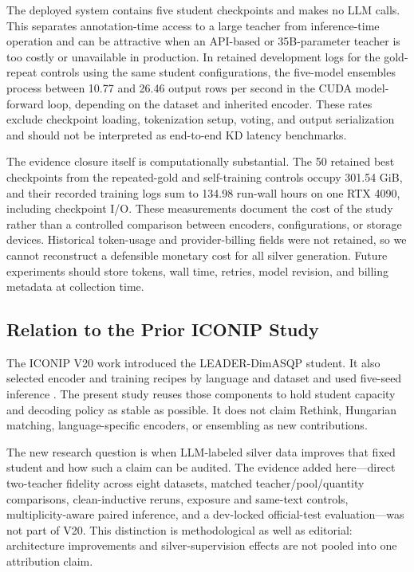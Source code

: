 The deployed system contains five student checkpoints and makes no LLM
calls. This separates annotation-time access to a large teacher from
inference-time operation and can be attractive when an API-based or
35B-parameter teacher is too costly or unavailable in production. In
retained development logs for the gold-repeat controls using the same
student configurations, the five-model ensembles process between 10.77
and 26.46 output rows per second in the CUDA model-forward loop,
depending on the dataset and inherited encoder. These rates exclude
checkpoint loading, tokenization setup, voting, and output serialization
and should not be interpreted as end-to-end KD latency benchmarks.

The evidence closure itself is computationally substantial. The 50
retained best checkpoints from the repeated-gold and self-training
controls occupy 301.54 GiB, and their recorded training logs sum to
134.98 run-wall hours on one RTX 4090, including checkpoint I/O. These
measurements document the cost of the study rather than a controlled
comparison between encoders, configurations, or storage devices.
Historical token-usage and provider-billing fields were not retained, so
we cannot reconstruct a defensible monetary cost for all silver
generation. Future experiments should store tokens, wall time, retries,
model revision, and billing metadata at collection time.

\subsection{Relation to the Prior ICONIP
Study}\label{relation-to-our-prior-iconip-study}

The ICONIP V20 work introduced the LEADER-DimASQP student. It also selected
encoder and training recipes by language and dataset and used five-seed
inference \citep{qin2026leader}. The present study reuses those components to hold
student capacity and decoding policy as stable as possible. It does not
claim Rethink, Hungarian matching, language-specific encoders, or
ensembling as new contributions.

The new research question is when LLM-labeled silver data improves that
fixed student and how such a claim can be audited. The evidence added
here---direct two-teacher fidelity across eight datasets, matched
teacher/pool/quantity comparisons, clean-inductive reruns, exposure and
same-text controls, multiplicity-aware paired inference, and a
dev-locked official-test evaluation---was not part of V20. This
distinction is methodological as well as editorial: architecture
improvements and silver-supervision effects are not pooled into one
attribution claim.

